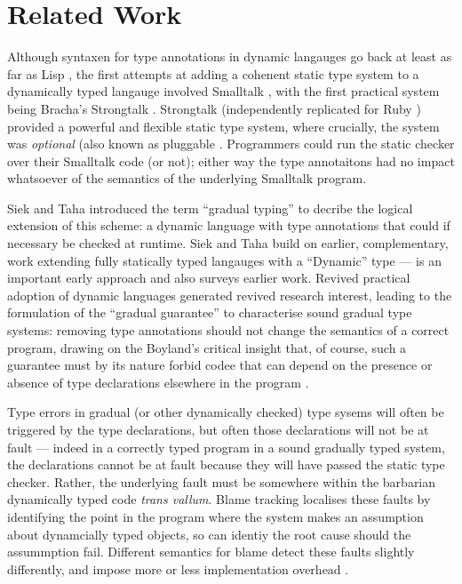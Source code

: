 
\section{Related Work}
\label{sec:related-work}

Although syntaxen for type annotations in dynamic langauges go back at
least as far as Lisp \cite{cltl2}, the first attempts at adding a
cohenent static type system to a dynamically typed langauge involved
Smalltalk \cite{RalphJohnson1986}, with the first practical system
being Bracha's Strongtalk \cite{Strongtalk1}. Strongtalk
(independently replicated for Ruby \cite{DiamondBackRuby}) provided a
powerful and flexible static type system, where crucially, the system
was \emph{optional} (also known as pluggable
\cite{BrachaPluggable2004}. Programmers could run the static checker
over their Smalltalk code (or not); either way the type annotaitons
had no impact whatsoever of the semantics of the underlying Smalltalk
program.

Siek and Taha introduced the term ``gradual typing''
\cite{seikTaha2006} to decribe the logical extension of this scheme: a
dynamic language with type annotations that could if necessary be
checked at runtime. Siek and Taha build on earlier, complementary,
work extending fully statically typed langauges with a ``Dynamic''
type --- \cite{AbadiTOPLAS1991} is an important early approach
and also surveys earlier work. Revived practical adoption of dynamic
languages generated revived research interest, leading to the
formulation of the ``gradual guarantee''
\cite{gradualGuarantee,revisedGradualGuarantee} to characterise sound
gradual type systems: removing type annotations should not change the
semantics of a correct program, drawing on the Boyland's critical
insight that, of course, such a guarantee must by its nature forbid
codee that can depend on the presence or absence of type declarations 
elsewhere in the program \cite{BoylandFOOLBeingMeanAboutGrace}. 

Type errors in gradual (or other dynamically checked) type sysems will
often be triggered by the type declarations, but often those
declarations will not be at fault --- indeed in a correctly typed
program in a sound gradually typed system,  the declarations cannot be
at fault because they will have passed the static type
checker. Rather, the underlying fault must be somewhere within the
barbarian dynamically typed code \emph{trans vallum}.  Blame tracking
\cite{blame,blameyblame,blame} localises these faults by identifying
the point in the program where the system makes an 
assumption about dynamcially typed objects, so can identiy the root
cause should the assummption fail.  Different semantics for blame
detect these faults slightly differently, and impose more or less
implementation overhead \cite{moreBLameStuff}.

